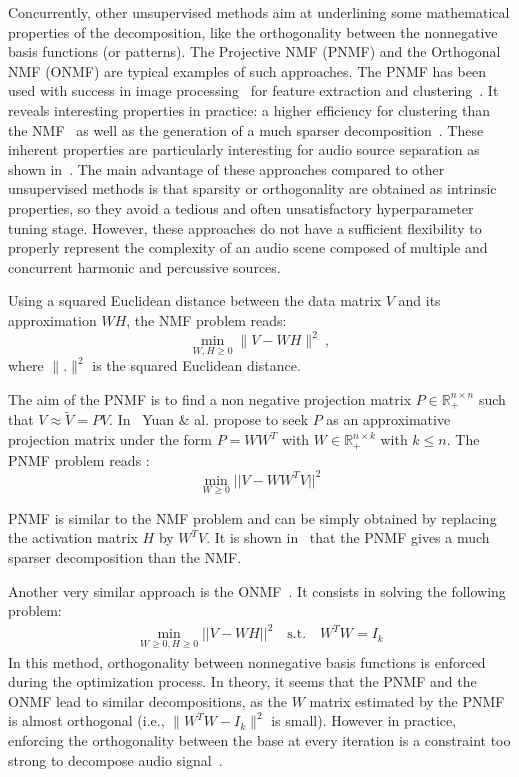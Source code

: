 Concurrently, other unsupervised methods aim at underlining some mathematical properties of the decomposition, like the orthogonality between the nonnegative basis functions (or patterns). The Projective NMF (PNMF) and the Orthogonal NMF (ONMF) are typical examples of such approaches. The PNMF has been used with success in image processing~\cite{choi} for feature extraction and clustering~\cite{YangOja10}. It reveals interesting properties in practice: a higher efficiency for clustering than the NMF~\cite{choi} as well as the generation of a much sparser decomposition~\cite{YangOja10}. These inherent properties are particularly interesting for audio source separation as shown in~\cite{canadas2014percussive}. 
The main advantage of these approaches compared to other unsupervised methods is that sparsity or orthogonality are obtained as intrinsic properties, so they avoid a tedious and often unsatisfactory hyperparameter tuning stage. However, these approaches do not have a sufficient flexibility to properly represent the complexity of an audio scene composed of multiple and concurrent harmonic and percussive sources.

Using a squared Euclidean distance between the data matrix $V$ and its approximation $WH$, the NMF problem reads:
$$
\min_{W,H\geq 0} \|V - WH\|^2\ , 
$$
where $\|.\|^{2}$ is the squared Euclidean distance.

The aim of the PNMF is to find a non negative projection matrix $P \in \mathbb{R}_{+}^{n \times n}$ such that $V \approx \tilde{V} = PV$. In~\cite{yuanOja2005} Yuan \& al. propose to seek $P$ as an approximative projection matrix under the form $P = WW^{T}$ with $W \in \mathbb{R}_{+}^{n \times k}$ with $ k \leqslant n $. The PNMF problem reads : 
\begin{equation}\label{EqPnmf}
\min_{W \geqslant 0} ||V - WW^{T}V||^2 
\end{equation}

PNMF is similar to the NMF problem and can be simply obtained by replacing the activation matrix $H$ by $W^TV$. It is shown in~\cite{YangOja10} that the PNMF gives a much sparser decomposition than the NMF.

Another very similar approach is the ONMF~\cite{choi}. It consists in solving the following problem: 
\begin{align}
\min_{W \geqslant 0, H \geqslant0} ||V - WH||^2 \quad   \text{s.t}.\quad W^{T}W=I_{k} 
\end{align}%
In this method, orthogonality between nonnegative basis functions is enforced during the optimization process. In theory, it seems that the PNMF and the ONMF lead to similar decompositions, as the $W$ matrix estimated by the PNMF is almost orthogonal (i.e., $\|W^{T}W-I_{k}\|^{2}$ is small). However in practice, enforcing the orthogonality between the base at every iteration is a constraint too strong to decompose audio signal~\cite{laroche2015structured}. 

